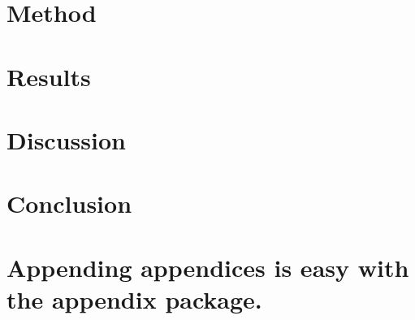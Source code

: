 \documentclass[aps,reprint]{revtex4-1}
\newcommand\blankpage{%
  \null
  \thispagestyle{empty}%
  \addtocounter{page}{-1}%
  \newpage}
\begin{document}
\section{Method}
\label{sec:method}

\section{Results}
\label{sec:results}

\section{Discussion}
\label{sec:discussion}

\section{Conclusion}
\label{sec:conclusion}


\blankpage
\appendix
\section{Appending appendices is easy with the appendix package.}
\blankpage
\end{document}
